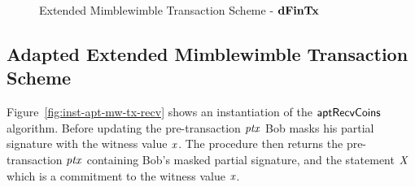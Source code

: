 \begin{figure}
    \caption{Extended Mimblewimble Transaction Scheme - $\mathbf{dFinTx}$ \label{fig:ext-mim-tx-fin}}
\end{figure}

\subsection{Adapted Extended Mimblewimble Transaction Scheme}

Figure~\cref{fig:inst-apt-mw-tx-recv} shows an instantiation of the $\mathsf{aptRecvCoins}$ algorithm.
Before updating the pre-transaction $\mathit{ptx}$ Bob masks his partial signature with the witness value $\mathit{x}$.
The procedure then returns the pre-transaction $\mathit{ptx}$ containing Bob's masked partial signature, and the statement $\mathit{X}$ which is a commitment to the witness value $\mathit{x}$.

